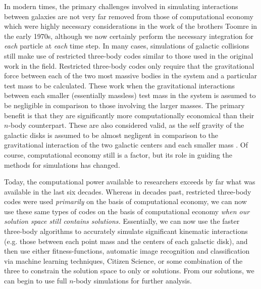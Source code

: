 In modern times, the primary challenges involved in simulating
interactions between galaxies are not very far removed from those of
computational economy which were highly necessary considerations in the work
of the brothers Toomre in the early 1970s, although we now certainly perform
the necessary integration for \textit{each} particle at \textit{each} time step.
In many cases, simulations of galactic collisions still make use of restricted
three-body codes similar to those used in the original work in the field.
Restricted three-body codes
only require that the gravitational force between each of the two most massive
bodies in the system and a particular test mass to be calculated. These work
when the gravitational interactions between each smaller (essentially massless)
test mass in the system is assumed to be negligible in comparison to those
involving the larger masses. The primary benefit is that they are significantly
more computationally economical than their $n$-body counterpart.
These are also considered valid, as the self gravity of the galactic disks is
assumed to
be almost negligent in comparison to the gravitational interaction of the two
galactic centers and each smaller mass \cite{Toomre1972}. Of course,
computational economy still is a factor, but its role in guiding the methods
for simulations has changed.

Today, the computational power available to researchers
exceeds by far what was available in the last six decades. Whereas in decades
past, restricted three-body codes were used \textit{primarily} on the basis of
computational economy, we can now use these same types of codes on the basis
of computational economy \textit{when our solution space still contains
 solutions.} Essentially, we can now use the faster three-body
algorithms
to accurately simulate significant kinematic interactions (e.g. those between
each point mass and the centers of each galactic disk), and then use either
fitness-functions,
automatic image recognition and classification via machine learning techniques,
Citizen Science, or some combination of the three to constrain the solution
space to only  or  solutions. From our  solutions,
we can begin to use full $n$-body simulations for further analysis.

